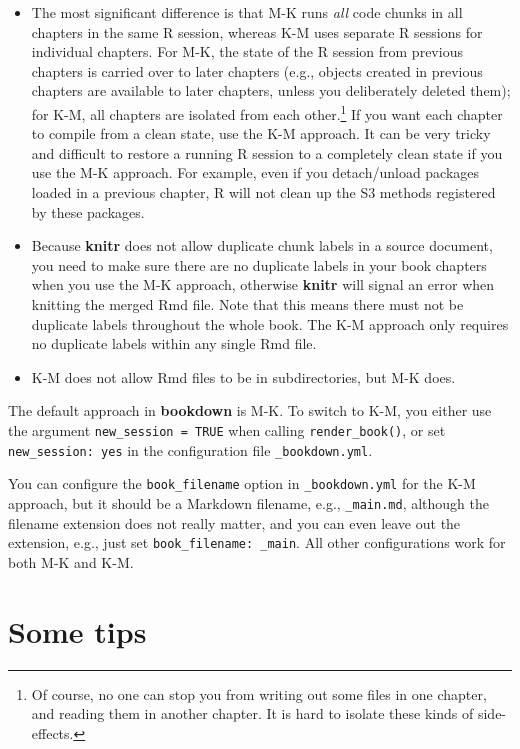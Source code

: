 \documentclass[
]{book}
\providecommand{\tightlist}{%
  \setlength{\itemsep}{0pt}\setlength{\parskip}{0pt}}
\begin{document}
\begin{itemize}
\tightlist
\item
  The most significant difference is that M-K runs \emph{all} code chunks in all chapters in the same R session, whereas K-M uses separate R sessions for individual chapters. For M-K, the state of the R session from previous chapters is carried over to later chapters (e.g., objects created in previous chapters are available to later chapters, unless you deliberately deleted them); for K-M, all chapters are isolated from each other.\footnote{Of course, no one can stop you from writing out some files in one chapter, and reading them in another chapter. It is hard to isolate these kinds of side-effects.} If you want each chapter to compile from a clean state, use the K-M approach. It can be very tricky and difficult to restore a running R session to a completely clean state if you use the M-K approach. For example, even if you detach/unload packages loaded in a previous chapter, R will not clean up the S3 methods registered by these packages.
\item
  Because \textbf{knitr} does not allow duplicate chunk labels in a source document, you need to make sure there are no duplicate labels in your book chapters when you use the M-K approach, otherwise \textbf{knitr} will signal an error when knitting the merged Rmd file. Note that this means there must not be duplicate labels throughout the whole book. The K-M approach only requires no duplicate labels within any single Rmd file.
\item
  K-M does not allow Rmd files to be in subdirectories, but M-K does.
\end{itemize}

The default approach in \textbf{bookdown} is M-K. To switch to K-M, you either use the argument \texttt{new\_session\ =\ TRUE} when calling \texttt{render\_book()}, or set \texttt{new\_session:\ yes} in the configuration file \texttt{\_bookdown.yml}.

You can configure the \texttt{book\_filename} option in \texttt{\_bookdown.yml} for the K-M approach, but it should be a Markdown filename, e.g., \texttt{\_main.md}, although the filename extension does not really matter, and you can even leave out the extension, e.g., just set \texttt{book\_filename:\ \_main}. All other configurations work for both M-K and K-M.

\hypertarget{some-tips}{%
\section{Some tips}\label{some-tips}}
\end{document}
